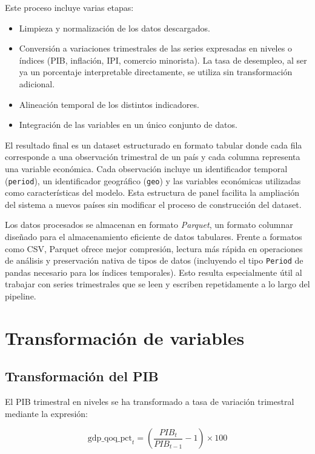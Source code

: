 Este proceso incluye varias etapas:

\begin{itemize}
    \item Limpieza y normalización de los datos descargados.
    \item Conversión a variaciones trimestrales de las series expresadas en niveles o índices
          (PIB, inflación, IPI, comercio minorista). La tasa de desempleo, al ser ya un
          porcentaje interpretable directamente, se utiliza sin transformación adicional.
    \item Alineación temporal de los distintos indicadores.
    \item Integración de las variables en un único conjunto de datos.
\end{itemize}

El resultado final es un dataset estructurado en formato tabular donde cada fila corresponde a una observación trimestral de un país y cada columna representa una variable económica. Cada observación incluye un identificador temporal (\texttt{period}), un identificador geográfico (\texttt{geo}) y las variables económicas utilizadas como características del modelo. Esta estructura de panel facilita la ampliación del sistema a nuevos países sin modificar el proceso de construcción del dataset.

Los datos procesados se almacenan en formato \textit{Parquet}, un formato columnar diseñado para el almacenamiento eficiente de datos tabulares. Frente a formatos como CSV, Parquet ofrece mejor compresión, lectura más rápida en operaciones de análisis y preservación nativa de tipos de datos (incluyendo el tipo \texttt{Period} de pandas necesario para los índices temporales). Esto resulta especialmente útil al trabajar con series trimestrales que se leen y escriben repetidamente a lo largo del pipeline.

\section{Transformación de variables}

\subsection{Transformación del PIB}

El PIB trimestral en niveles se ha transformado a tasa de variación trimestral mediante la expresión:

\[
\text{gdp\_qoq\_pct}_t =
\left(\frac{PIB_t}{PIB_{t-1}} - 1\right)\times100
\]

